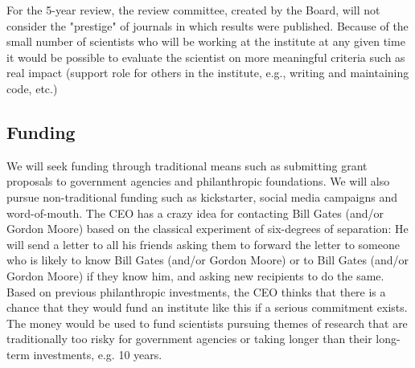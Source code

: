 For the 5-year review, the review committee, created by the Board, will not consider the "prestige" of journals in which results were published. Because of the small number of scientists who will be working at the institute at any given time it would be possible to evaluate the scientist on more meaningful criteria such as real impact (support role for others in the institute, e.g., writing and maintaining code, etc.)

\subsection{Funding}

We will seek funding through traditional means such as submitting grant proposals to government agencies and philanthropic foundations. We will also pursue non-traditional funding such as kickstarter, social media campaigns and word-of-mouth. The CEO has a crazy idea for contacting Bill Gates (and/or Gordon Moore) based on the classical experiment of six-degrees of separation: He will send a letter to all his friends asking them to forward the letter to someone who is likely to know Bill Gates (and/or Gordon Moore) or to Bill Gates (and/or Gordon Moore) if they know him, and asking new recipients to do the same. Based on previous philanthropic investments, the CEO thinks that there is a chance that they would fund an institute like this if a serious commitment exists. The money would be used to fund scientists pursuing themes of research that are traditionally too risky for government agencies or taking longer than their long-term investments, e.g. 10 years.
